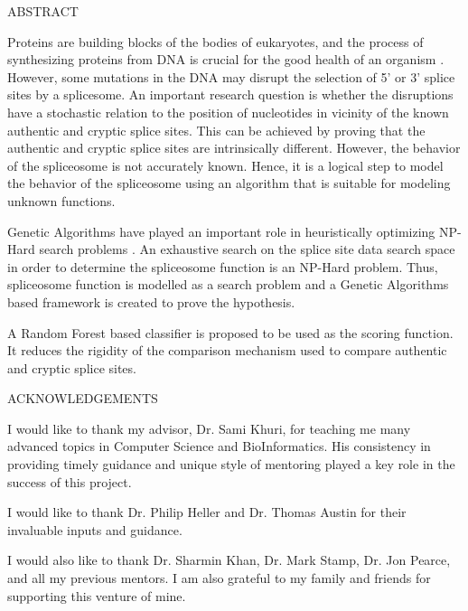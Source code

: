 \documentclass[12pt,a4paper]{article}
\begin{document}
	\begin{center}
		\large ABSTRACT\\
	\end{center}
	Proteins are building blocks of the bodies of eukaryotes, and the process of synthesizing proteins from DNA is crucial for the good health of an organism \cite{khuri3}. However, some mutations in the DNA may disrupt the selection of 5' or 3' splice sites by a splicesome. An important research question is whether the disruptions have a stochastic relation to the position of nucleotides in vicinity of the known authentic and cryptic splice sites. This can be achieved by proving that the authentic and cryptic splice sites are intrinsically different. However, the behavior of the spliceosome is not accurately known. Hence, it is a logical step to model the behavior of the spliceosome using an algorithm that is suitable for modeling unknown functions. \par
	Genetic Algorithms have played an important role in heuristically optimizing NP-Hard search problems \cite{handbook}. An exhaustive search on the splice site data search space in order to determine the spliceosome function is an NP-Hard problem. Thus, spliceosome function is modelled as a search problem and a Genetic Algorithms based framework is created to prove the hypothesis. \par
	A Random Forest based classifier is proposed to be used as the scoring function. It reduces the rigidity of the comparison mechanism used to compare authentic and cryptic splice sites.
    	
    \thispagestyle{empty}
    \newpage
	\begin{center}
		\large ACKNOWLEDGEMENTS\\
	\end{center}
	I would like to thank my advisor, Dr. Sami Khuri, for teaching me many advanced topics in Computer Science and BioInformatics. His consistency in providing timely guidance and unique style of mentoring played a key role in the success of this project.\par
	I would like to thank Dr. Philip Heller and Dr. Thomas Austin for their invaluable inputs and guidance. \par
	I would also like to thank Dr. Sharmin Khan, Dr. Mark Stamp, Dr. Jon Pearce, and all my previous mentors.
	I am also grateful to my family and friends for supporting this venture of mine.

    \thispagestyle{empty}
	\newpage
	
\end{document}
